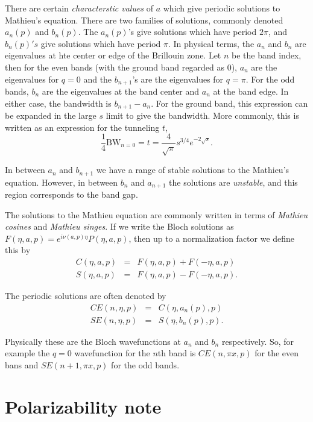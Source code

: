 \documentclass{article}
\theoremstyle{definition}
\begin{document}
There are certain \emph{characterstic values} of $a$ which give periodic solutions to Mathieu's equation. There are two families of solutions, commonly denoted $a_n(p)$ and $b_n(p)$. The $a_n(p)$'s give solutions which have period $2\pi$, and $b_n(p)'s$ give solutions which have period $\pi$. In physical terms, the $a_n$ and $b_n$ are eigenvalues at hte center or edge of the Brillouin zone. Let $n$ be the band index, then for the even bands (with the ground band regarded as $0$), $a_n$ are the eigenvalues for $q=0$ and the $b_{n+1}$'s are the eigenvalues for $q=\pi$. For the odd bands, $b_n$ are the eigenvalues at the band center and $a_n$ at the band edge. In either case, the bandwidth is $b_{n+1} - a_n$. For the ground band, this expression can be expanded in the large $s$ limit to give the bandwidth. More commonly, this is written as an expression for the tunneling $t$,
\begin{equation}
\frac{1}{4} \text{BW}_{n=0} = t = \frac{4}{\sqrt{\pi}} s^{3/4} e^{-2 \sqrt{s}}.
\end{equation}

In between $a_n$ and $b_{n+1}$ we have a range of stable solutions to the Mathieu's equation. However, in between $b_n$ and $a_{n+1}$ the solutions are \emph{unstable}, and this region corresponds to the band gap.

The solutions to the Mathieu equation are commonly written in terms of \emph{Mathieu cosines} and \emph{Mathieu singes}. If we write the Bloch solutions as $F(\eta, a, p) = e^{i \nu(a, p) \eta} P(\eta, a, p)$, then up to a normalization factor we define this by
\begin{eqnarray}
C(\eta, a, p) &=& F(\eta, a, p) + F(-\eta, a, p)\\
S(\eta, a, p) &=& F(\eta, a, p) - F(-\eta, a, p).
\end{eqnarray}

The periodic solutions are often denoted by
\begin{eqnarray}
CE(n, \eta, p) &=& C(\eta, a_n(p), p)\\
SE(n, \eta, p) &=& S(\eta, b_n(p), p).
\end{eqnarray}

Physically these are the Bloch wavefunctions at $a_n$ and $b_n$ respectively. So, for example the $q=0$ wavefunction for the $n$th band is $CE(n, \pi x, p)$ for the even bans and $SE(n+1, \pi x, p)$ for the odd bands.

\section{Polarizability note}
\end{document}
